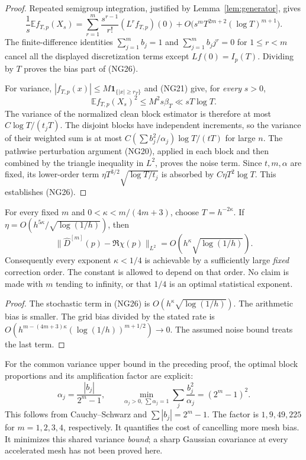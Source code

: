 \begin{proof}
Repeated semigroup integration, justified by Lemma~\ref{lem:generator},
gives
\[
 \frac1s\mathbb E f_{T,p}(X_s)
 =\sum_{r=1}^m\frac{s^{r-1}}{r!}(L^rf_{T,p})(0)
       +O\bigl(s^mT^{2m+2}(\log T)^{m+1}\bigr).           \tag{NG27}
\]
The finite-difference identities
$\sum_{j=1}^m b_j=1$ and
$\sum_{j=1}^m b_jj^r=0$ for $1\le r<m$ cancel all the displayed
discretization terms except $Lf(0)=I_p(T)$.  Dividing by $T$ proves the
bias part of (NG26).

For variance, $|f_{T,p}(x)|\le M\mathbf1_{\{|x|\ge r_T\}}$ and (NG21)
give, for \emph{every} $s>0$,
\[
 \mathbb E f_{T,p}(X_s)^2\le M^2s\beta_T
                         \ll sT\log T.
\]
The variance of the normalized clean block estimator is therefore at
most $C\log T/(t_jT)$.  The disjoint blocks have independent increments,
so the variance of their weighted sum is at most
$C(\sum b_j^2/\alpha_j)\log T/(tT)$ for large $n$.
The pathwise perturbation argument (NG20), applied in each block and
then combined by the triangle inequality in $L^2$, proves the noise term.
Since $t,m,\alpha$ are fixed, its lower-order term
$\eta T^{3/2}\sqrt{\log T/t_j}$ is absorbed by
$C\eta T^2\log T$.  This establishes (NG26).
\end{proof}

\begin{corollary}
\label{cor:quarter-rate}
For every fixed $m$ and $0<\kappa<m/(4m+3)$, choose $T=h^{-2\kappa}$.
If $\eta=O(h^{5\kappa}/\sqrt{\log(1/h)})$, then
\[
 \|\widehat D^{[m]}(p)-\Re\chi(p)\|_{L^2}
       =O\!\left(h^\kappa\sqrt{\log(1/h)}\right).         \tag{NG28}
\]
Consequently every exponent $\kappa<1/4$ is achievable by a sufficiently
large \emph{fixed} correction order.  The constant is allowed to depend
on that order.  No claim is made with $m$ tending to infinity, or that
$1/4$ is an optimal statistical exponent.
\end{corollary}

\begin{proof}
The stochastic term in (NG26) is $O(h^\kappa\sqrt{\log(1/h)})$.
The arithmetic bias is smaller.  The grid bias divided by the stated
rate is
$O(h^{m-(4m+3)\kappa}(\log(1/h))^{m+1/2})\to0$.
The assumed noise bound treats the last term.
\end{proof}

For the common variance upper bound in the preceding proof, the optimal
block proportions and its amplification factor are explicit:
\[
 \alpha_j=\frac{|b_j|}{2^m-1},\qquad
 \min_{\alpha_j>0,\,\sum\alpha_j=1}
       \sum_j\frac{b_j^2}{\alpha_j}=(2^m-1)^2.             \tag{NG29}
\]
This follows from Cauchy--Schwarz and $\sum|b_j|=2^m-1$.
The factor is $1,9,49,225$ for $m=1,2,3,4$, respectively.  It quantifies
the cost of cancelling more mesh bias.  It minimizes this shared
variance \emph{bound}; a sharp Gaussian covariance at every accelerated
mesh has not been proved here.

